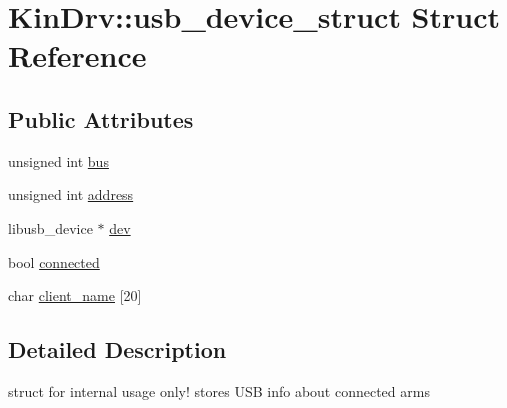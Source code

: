 \hypertarget{structKinDrv_1_1usb__device__struct}{\section{Kin\+Drv\+:\+:usb\+\_\+device\+\_\+struct Struct Reference}
\label{structKinDrv_1_1usb__device__struct}
}
\subsection*{Public Attributes}
\begin{DoxyCompactItemize}
\item 
unsigned int \hyperlink{structKinDrv_1_1usb__device__struct_a0e6de35dc6c03706c83ace64c9febb37}{bus}
\item 
unsigned int \hyperlink{structKinDrv_1_1usb__device__struct_a68e7077ad8819f255088238f9b1cd252}{address}
\item 
libusb\+\_\+device $\ast$ \hyperlink{structKinDrv_1_1usb__device__struct_a9b0ea0b72fe367e18da99404e9d57c9d}{dev}
\item 
bool \hyperlink{structKinDrv_1_1usb__device__struct_a5edef24a9b1076404c9ab42410c82952}{connected}
\item 
char \hyperlink{structKinDrv_1_1usb__device__struct_a03a9e83a8e46ac647654302ceafb2a5f}{client\+\_\+name} \mbox{[}20\mbox{]}
\end{DoxyCompactItemize}


\subsection{Detailed Description}
struct for internal usage only! stores U\+S\+B info about connected arms 

